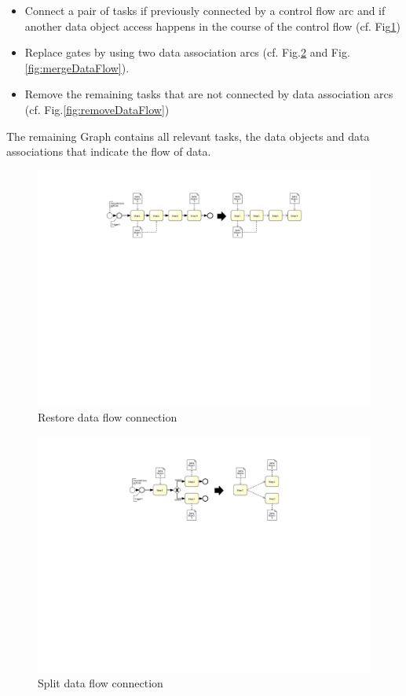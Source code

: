 \begin{itemize}
	\item Connect a pair of tasks if previously connected by a control flow arc and 
	if another data object access happens in the course of the control flow (cf. Fig\ref{fig:restoreDataFlow})
	\item Replace gates by using two data association arcs (cf. Fig.\ref{fig:splitDataFlow} and Fig.\ref{fig:mergeDataFlow}). 
	\item Remove the remaining tasks that are not connected by data association arcs (cf. Fig.\ref{fig:removeDataFlow})
	
\end{itemize}
The remaining Graph contains all relevant tasks, the data objects and data associations that indicate the flow of data.

\begin{figure}[h!]
	\centering
	\includegraphics[width=\textwidth, trim={7.5cm 15cm 7cm 2cm}]{img/ExtractDFDRestore.pdf}
	\caption{Restore data flow connection}
	\label{fig:restoreDataFlow}
\end{figure}

\begin{figure}[h!]
	\includegraphics[width=14cm, trim={8.5cm 13.8cm 8.5cm 2.2cm}]{img/ExtractDFDGateWaySplit.pdf}
	\caption{Split data flow connection}
	\label{fig:splitDataFlow}
\end{figure}

